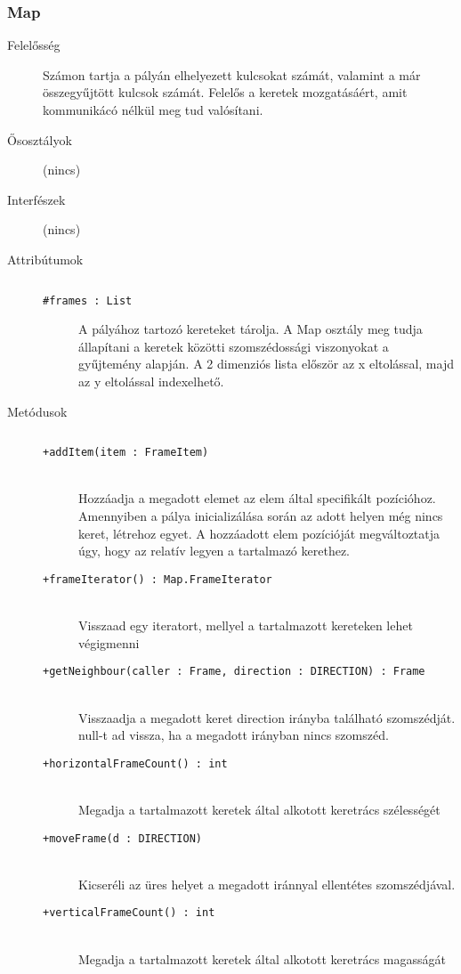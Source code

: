 		\subsubsection{Map}
			\begin{description}

				\item[Felelősség] Számon tartja a pályán elhelyezett kulcsokat számát, valamint a már összegyűjtött kulcsok számát. Felelős a keretek mozgatásáért, amit kommunikácó nélkül meg tud valósítani.

				\item[Ősosztályok] (nincs)
				\item[Interfészek] (nincs)
				\item[Attribútumok]$\ $
					\begin{description}
						\item[\texttt{\#frames : List}]A pályához tartozó kereteket tárolja. A Map osztály  meg tudja állapítani a keretek közötti szomszédossági  viszonyokat a gyűjtemény alapján.    A 2 dimenziós lista először az x eltolással,   majd az y eltolással indexelhető.
					\end{description}
				\item[Metódusok]$\ $
					\begin{description}
						\item[\texttt{+addItem(item : FrameItem)}] \hfill \\Hozzáadja a megadott elemet az elem által specifikált pozícióhoz.  Amennyiben a pálya inicializálása során az adott helyen még nincs keret,  létrehoz egyet.   A hozzáadott elem pozícióját megváltoztatja úgy, hogy az relatív  legyen a tartalmazó kerethez. 
						\item[\texttt{+frameIterator() : Map.FrameIterator}] \hfill \\Visszaad egy iteratort, mellyel a tartalmazott kereteken lehet végigmenni 
						\item[\texttt{+getNeighbour(caller : Frame, direction : DIRECTION) : Frame}] \hfill \\Visszaadja a megadott keret direction irányba található  szomszédját. null-t ad vissza, ha a megadott irányban  nincs szomszéd. 
						\item[\texttt{+horizontalFrameCount() : int}] \hfill \\Megadja a tartalmazott keretek által alkotott keretrács szélességét 
						\item[\texttt{+moveFrame(d : DIRECTION)}] \hfill \\Kicseréli az üres helyet a megadott iránnyal ellentétes  szomszédjával. 
						\item[\texttt{+verticalFrameCount() : int}] \hfill \\Megadja a tartalmazott keretek által alkotott keretrács magasságát 
					\end{description}
			\end{description}

